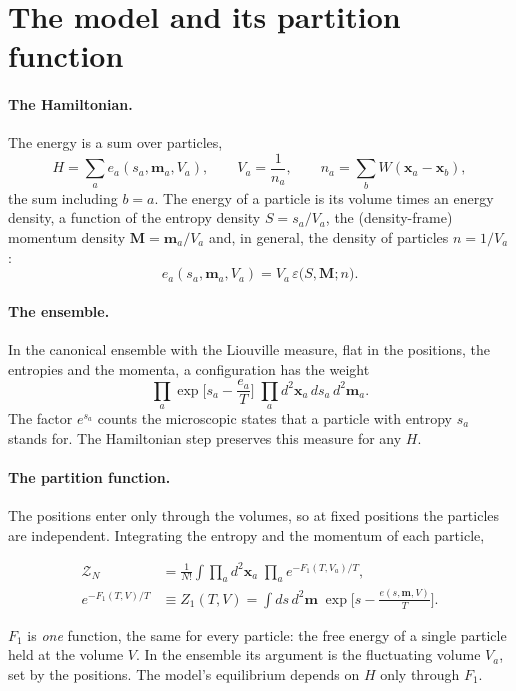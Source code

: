 \documentclass[11pt,aps,preprint,nofootinbib,superscriptaddress,tightenlines]{revtex4-2}
\def\st{\begin{equation}}
\def\stp{\end{equation}}
\let\oldparagraph\paragraph
\renewcommand{\paragraph}{\par\bigskip\oldparagraph}
\begin{document}
\section{The model and its partition function}
\label{sec:Z}

\paragraph{The Hamiltonian.}  The energy is a sum over particles,
\st
H=\sum_ae_a(s_a,\bm m_a,V_a),\qquad V_a=\frac1{n_a},\qquad n_a=\sum_bW(\bm x_a-\bm x_b),
\stp
the sum including $b=a$.  The energy of a particle is its volume times an energy density, a function of the entropy density $S=s_a/V_a$, the (density-frame)
momentum density $\bm M=\bm m_a/V_a$ and, in general, the density of particles $n=1/V_a$:
\st
e_a(s_a,\bm m_a,V_a)=V_a\,\varepsilon\big(S,\bm M;n\big) .
\stp

\paragraph{The ensemble.}  In the canonical ensemble with the Liouville measure, flat in the positions, the entropies and the momenta, a configuration has
the weight
\st
\prod_a\exp\Big[s_a-\frac{e_a}T\Big]\;\prod_ad^2\bm x_a\,ds_a\,d^2\bm m_a .
\stp
The factor $e^{s_a}$ counts the microscopic states that a particle with entropy $s_a$ stands for.  The Hamiltonian step preserves this measure for any $H$.

\paragraph{The partition function.}  The positions enter only through the volumes, so at fixed positions the particles are independent.  Integrating the
entropy and the momentum of each particle,
\begin{keyeq}
\st
\begin{aligned}
\mathcal Z_N&=\frac1{N!}\int\prod_ad^2\bm x_a\;\prod_ae^{-F_1(T,V_a)/T},\\
e^{-F_1(T,V)/T}&\equiv Z_1(T,V)=\int ds\,d^2\bm m\;\exp\Big[s-\frac{e(s,\bm m,V)}T\Big] .
\end{aligned}
\label{ZN}
\stp
\end{keyeq}
$F_1$ is \emph{one} function, the same for every particle: the free energy of a single particle held at the volume $V$.  In the ensemble its argument is the
fluctuating volume $V_a$, set by the positions.  The model's equilibrium depends on $H$ only through $F_1$.
\end{document}
